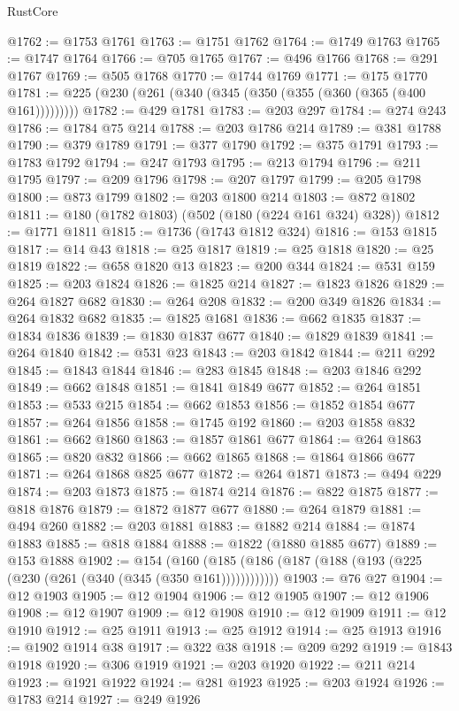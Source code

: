 \begin{lexlean}{RustCore}
\begin{coremodule}
@1762 := @1753 @1761
@1763 := @1751 @1762
@1764 := @1749 @1763
@1765 := @1747 @1764
@1766 := @705 @1765
@1767 := @496 @1766
@1768 := @291 @1767
@1769 := @505 @1768
@1770 := @1744 @1769
@1771 := @175 @1770
@1781 := @225 (@230 (@261 (@340 (@345 (@350 (@355 (@360 (@365 (@400 @161)))))))))
@1782 := @429 @1781
@1783 := @203 @297
@1784 := @274 @243
@1786 := @1784 @75 @214
@1788 := @203 @1786 @214
@1789 := @381 @1788
@1790 := @379 @1789
@1791 := @377 @1790
@1792 := @375 @1791
@1793 := @1783 @1792
@1794 := @247 @1793
@1795 := @213 @1794
@1796 := @211 @1795
@1797 := @209 @1796
@1798 := @207 @1797
@1799 := @205 @1798
@1800 := @873 @1799
@1802 := @203 @1800 @214
@1803 := @872 @1802
@1811 := @180 (@1782 @1803) (@502 (@180 (@224 @161 @324) @328))
@1812 := @1771 @1811
@1815 := @1736 (@1743 @1812 @324)
@1816 := @153 @1815
@1817 := @14 @43
@1818 := @25 @1817
@1819 := @25 @1818
@1820 := @25 @1819
@1822 := @658 @1820 @13
@1823 := @200 @344
@1824 := @531 @159
@1825 := @203 @1824
@1826 := @1825 @214
@1827 := @1823 @1826
@1829 := @264 @1827 @682
@1830 := @264 @208
@1832 := @200 @349 @1826
@1834 := @264 @1832 @682
@1835 := @1825 @1681
@1836 := @662 @1835
@1837 := @1834 @1836
@1839 := @1830 @1837 @677
@1840 := @1829 @1839
@1841 := @264 @1840
@1842 := @531 @23
@1843 := @203 @1842
@1844 := @211 @292
@1845 := @1843 @1844
@1846 := @283 @1845
@1848 := @203 @1846 @292
@1849 := @662 @1848
@1851 := @1841 @1849 @677
@1852 := @264 @1851
@1853 := @533 @215
@1854 := @662 @1853
@1856 := @1852 @1854 @677
@1857 := @264 @1856
@1858 := @1745 @192
@1860 := @203 @1858 @832
@1861 := @662 @1860
@1863 := @1857 @1861 @677
@1864 := @264 @1863
@1865 := @820 @832
@1866 := @662 @1865
@1868 := @1864 @1866 @677
@1871 := @264 @1868 @825 @677
@1872 := @264 @1871
@1873 := @494 @229
@1874 := @203 @1873
@1875 := @1874 @214
@1876 := @822 @1875
@1877 := @818 @1876
@1879 := @1872 @1877 @677
@1880 := @264 @1879
@1881 := @494 @260
@1882 := @203 @1881
@1883 := @1882 @214
@1884 := @1874 @1883
@1885 := @818 @1884
@1888 := @1822 (@1880 @1885 @677)
@1889 := @153 @1888
@1902 := @154
    (@160 (@185 (@186 (@187 (@188 (@193 (@225 (@230 (@261 (@340 (@345 (@350 @161))))))))))))
@1903 := @76 @27
@1904 := @12 @1903
@1905 := @12 @1904
@1906 := @12 @1905
@1907 := @12 @1906
@1908 := @12 @1907
@1909 := @12 @1908
@1910 := @12 @1909
@1911 := @12 @1910
@1912 := @25 @1911
@1913 := @25 @1912
@1914 := @25 @1913
@1916 := @1902 @1914 @38
@1917 := @322 @38
@1918 := @209 @292
@1919 := @1843 @1918
@1920 := @306 @1919
@1921 := @203 @1920
@1922 := @211 @214
@1923 := @1921 @1922
@1924 := @281 @1923
@1925 := @203 @1924
@1926 := @1783 @214
@1927 := @249 @1926

\end{coremodule}
\end{lexlean}
